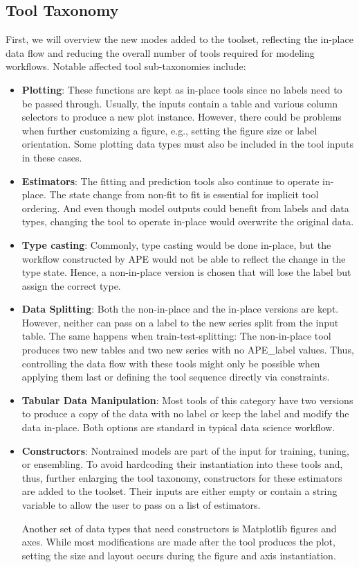 \subsection{Tool Taxonomy}
First, we will overview the new modes added to the toolset, reflecting the in-place data flow and reducing the overall number of tools required for modeling workflows. Notable affected tool sub-taxonomies include:

\begin{itemize}
    \item \textbf{Plotting}: These functions are kept as in-place tools since no labels need to be passed through. Usually, the inputs contain a table and various column selectors to produce a new plot instance. However, there could be problems when further customizing a figure, e.g., setting the figure size or label orientation. Some plotting data types must also be included in the tool inputs in these cases.
    \item \textbf{Estimators}: The fitting and prediction tools also continue to operate in-place. The state change from non-fit to fit is essential for implicit tool ordering. And even though model outputs could benefit from labels and data types, changing the tool to operate in-place would overwrite the original data.
    \item \textbf{Type casting}: Commonly, type casting would be done in-place, but the workflow constructed by APE would not be able to reflect the change in the type state. Hence, a non-in-place version is chosen that will lose the label but assign the correct type.
    \item \textbf{Data Splitting}: Both the non-in-place and the in-place versions are kept. However, neither can pass on a label to the new series split from the input table. The same happens when train-test-splitting: The non-in-place tool produces two new tables and two new series with no APE\_label values. Thus, controlling the data flow with these tools might only be possible when applying them last or defining the tool sequence directly via constraints.
    \item \textbf{Tabular Data Manipulation}: Most tools of this category have two versions to produce a copy of the data with no label or keep the label and modify the data in-place. Both options are standard in typical data science workflow.
    \item \textbf{Constructors}: Nontrained models are part of the input for training, tuning, or ensembling. To avoid hardcoding their instantiation into these tools and, thus, further enlarging the tool taxonomy, constructors for these estimators are added to the toolset. Their inputs are either empty or contain a string variable to allow the user to pass on a list of estimators.

    Another set of data types that need constructors is Matplotlib figures and axes. While most modifications are made after the tool produces the plot, setting the size and layout occurs during the figure and axis instantiation.
\end{itemize}

